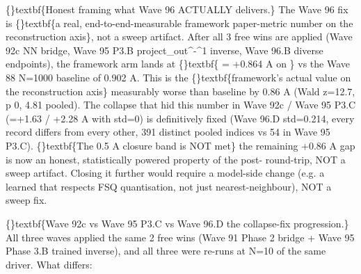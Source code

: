 \documentclass{article}
\begin{document}
\{\}textbf\{Honest framing  what Wave 96 ACTUALLY delivers.\} The Wave 96 fix is \{\}textbf\{a real, end-to-end-measurable framework paper-metric number on the reconstruction axis\}, not a sweep artifact. After all 3 free wins are applied (Wave 92c NN bridge, Wave 95 P3.B project\_out\textasciicircum{}-\textasciicircum{}1 inverse, Wave 96.B diverse endpoints), the framework arm lands at \{\}textbf\{ = +0.864 A on \} vs the Wave 88 N=1000 baseline of 0.902 A. This is the \{\}textbf\{framework's actual value on the reconstruction axis\}  measurably worse than baseline by 0.86 A (Wald z=12.7, p  0, 4.81 pooled). The collapse that hid this number in Wave 92c / Wave 95 P3.C (=+1.63 / +2.28 A with std=0) is definitively fixed (Wave 96.D std=0.214, every record differs from every other, 391 distinct pooled indices vs 54 in Wave 95 P3.C). \{\}textbf\{The 0.5 A closure band is NOT met\}  the remaining +0.86 A gap is now an honest, statistically powered property of the post- round-trip, NOT a sweep artifact. Closing it further would require a model-side change (e.g. a learned  that respects FSQ quantisation, not just nearest-neighbour), NOT a sweep fix.

\{\}textbf\{Wave 92c vs Wave 95 P3.C vs Wave 96.D  the collapse-fix progression.\} All three waves applied the same 2 free wins (Wave 91 Phase 2 bridge + Wave 95 Phase 3.B trained inverse), and all three were re-runs at N=10 of the same  driver. What differs:

\begin{table}[ht]
\centering
\small
{}%
\end{table}
\end{document}
